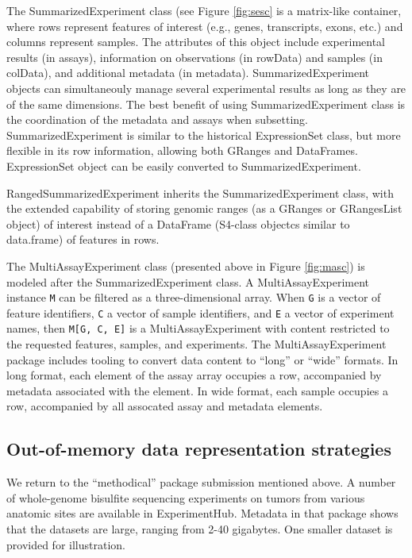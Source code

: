 \documentclass[]{article}
\begin{document}
The SummarizedExperiment class (see Figure \ref{fig:sesc} is a matrix-like container, where rows represent features of interest (e.g., genes, transcripts, exons, etc.) and columns represent samples. The attributes of this object include experimental results (in assays), information on observations (in rowData) and samples (in colData), and additional metadata (in metadata). SummarizedExperiment objects can simultaneouly manage several experimental results as long as they are of the same dimensions. The best benefit of using SummarizedExperiment class is the coordination of the metadata and assays when subsetting. SummarizedExperiment is similar to the historical ExpressionSet class, but more flexible in its row information, allowing both GRanges and DataFrames. ExpressionSet object can be easily converted to SummarizedExperiment.

RangedSummarizedExperiment inherits the SummarizedExperiment class, with the extended capability of storing genomic ranges (as a GRanges or GRangesList object) of interest instead of a DataFrame (S4-class objectcs similar to data.frame) of features in rows.

The MultiAssayExperiment class (presented above in
Figure \ref{fig:masc}) is modeled after the SummarizedExperiment class.
A MultiAssayExperiment instance \texttt{M} can be
filtered as a three-dimensional array.
When \texttt{G} is a vector of feature identifiers,
\texttt{C} a vector of sample identifiers, and \texttt{E} a
vector of experiment names, then \texttt{M{[}G, C, E{]}} is
a MultiAssayExperiment with content restricted to the
requested features, samples, and experiments. The MultiAssayExperiment
package includes tooling to convert data content to ``long'' or
``wide'' formats. In long format, each element of the assay array occupies
a row, accompanied by metadata associated with the element.
In wide format, each sample occupies a row, accompanied by all
assocated assay and metadata elements.

\hypertarget{out-of-memory-data-representation-strategies}{%
\subsection{Out-of-memory data representation strategies}\label{out-of-memory-data-representation-strategies}}

We return to the ``methodical'' package
submission mentioned above.
A number of whole-genome bisulfite sequencing experiments on
tumors from various anatomic sites are available
in ExperimentHub.
Metadata in that package shows that the datasets
are large, ranging from 2-40 gigabytes. One smaller
dataset is provided for illustration.
\end{document}

